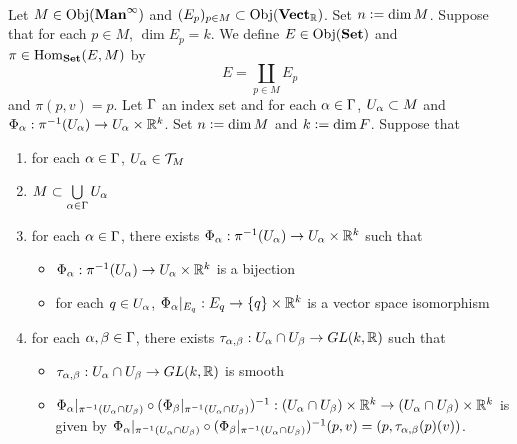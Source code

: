 \documentclass{book}
\begin{document}
\begin{ex}   \\
	Let $M \in \operatorname{Obj}(\operatorname*{\text{\textbf{Man}}^{\infty}})$ and $(E_p)_{p \in M} \subset \operatorname{Obj}(\operatorname*{\text{\textbf{Vect}}_{\mathbb{R}}})$. Set $n \vcentcolon= \dim M$. Suppose that for each $p \in M$, $\dim E_p = k$. We define $E \in \operatorname{Obj}(\text{\textbf{Set}})$ and $\pi \in \operatorname{Hom}_{\text{\textbf{Set}}}(E, M)$ by
	$$E = \coprod_{p \in M} E_p$$  
	and 
	$\pi(p, v) = p$. Let $\Gamma$ an index set and for each $\alpha \in \Gamma$, $U_{\alpha} \subset M$ and $\Phi_{\alpha}: \pi^{-1}(U_{\alpha}) \rightarrow U_{\alpha} \times \mathbb{R}^k$. Set $n \vcentcolon= \dim M$ and $k \vcentcolon= \dim F$. Suppose that
	\begin{enumerate}
		\item for each $\alpha \in \Gamma$, $U_{\alpha} \in \mathcal{T}_M$
		\item $M \subset \bigcup\limits_{\alpha \in \Gamma} U_{\alpha}$
		\item for each $\alpha \in \Gamma$, there exists $\Phi_{\alpha}: \pi^{-1}(U_{\alpha}) \rightarrow U_{\alpha} \times \mathbb{R}^k$ such that 
		\begin{itemize}
			\item $\Phi_{\alpha} : \pi^{-1}(U_{\alpha}) \rightarrow U_{\alpha} \times \mathbb{R}^k$ is a bijection 
			\item for each $q \in U_{\alpha}$, $\Phi_{\alpha}|_{E_q}:E_q \rightarrow \{q\} \times \mathbb{R}^k$ is a vector space isomorphism
		\end{itemize}
		\item for each $\alpha, \beta \in \Gamma$, there exists $\tau_{\alpha, \beta}: U_{\alpha} \cap U_{\beta} \rightarrow GL(k, \mathbb{R})$ such that 
		\begin{itemize}
			\item $\tau_{\alpha, \beta}: U_{\alpha} \cap U_{\beta} \rightarrow GL(k, \mathbb{R})$ is smooth
			\item $\Phi_{\alpha}|_{\pi^{-1}(U_{\alpha} \cap U_{\beta})} \circ (\Phi_{\beta}|_{\pi^{-1}(U_{\alpha} \cap U_{\beta})})^{-1}: (U_{\alpha} \cap U_{\beta}) \times \mathbb{R}^k \rightarrow (U_{\alpha} \cap U_{\beta}) \times \mathbb{R}^k$ is given by 
			$\Phi_{\alpha}|_{\pi^{-1}(U_{\alpha} \cap U_{\beta})} \circ (\Phi_{\beta}|_{\pi^{-1}(U_{\alpha} \cap U_{\beta})})^{-1}(p, v) = (p, \tau_{\alpha,\beta}(p)(v))$.
		\end{itemize}

\end{enumerate}
\end{ex}
\end{document}
